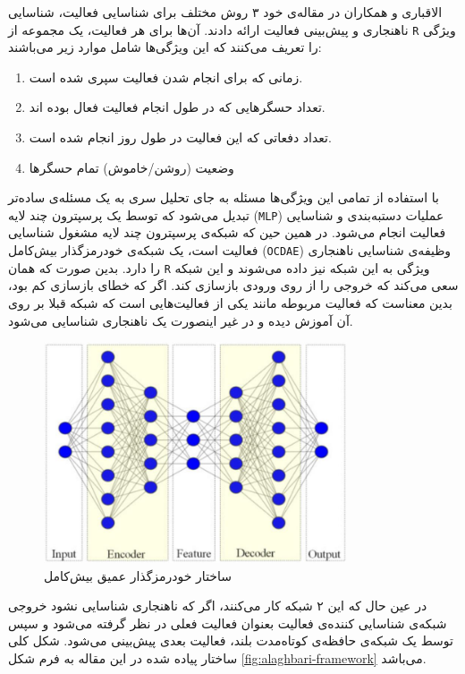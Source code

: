 الاقباری و همکاران\cite{alaghbari2022activities}
در مقاله‌ی خود ۳ روش مختلف برای شناسایی فعالیت، شناسایی ناهنجاری و پیش‌بینی فعالیت ارائه دادند. آن‌ها برای هر فعالیت، یک مجموعه از \verb|R| ویژگی را تعریف می‌کنند که این ویژگی‌ها شامل موارد زیر می‌باشند:
\begin{enumerate}
    \item زمانی که برای انجام شدن فعالیت سپری شده است.
    \item تعداد حسگرهایی که در طول انجام فعالیت فعال بوده اند.
    \item تعداد دفعاتی که این فعالیت در طول روز انجام شده است.
    \item وضعیت (روشن/خاموش) تمام حسگرها
\end{enumerate}

با استفاده از تمامی این ویژگی‌ها مسئله به جای تحلیل سری به یک مسئله‌ی ساده‌تر تبدیل می‌شود که توسط
یک پرسپترون چند لایه (\verb|MLP|)
عملیات دستبه‌بندی و شناسایی فعالیت انجام می‌شود. در همین حین که شبکه‌ی پرسپترون چند لایه مشغول شناسایی فعالیت است، یک
شبکه‌ی خودرمزگذار بیش‌کامل (\verb|OCDAE|)
وظیفه‌ی شناسایی ناهنجاری را دارد. بدین صورت که  همان \verb|R| ویژگی به این شبکه نیز داده می‌شوند و این شبکه سعی می‌کند که خروجی را از روی ورودی بازسازی کند. اگر که
خطای بازسازی
کم بود، بدین معناست که فعالیت مربوطه مانند یکی از فعالیت‌هایی است که شبکه قبلا بر روی آن آموزش دیده و در غیر اینصورت یک ناهنجاری شناسایی می‌شود.
\begin{figure}[htbp]
  \centering
  \includegraphics[width=0.8\textwidth]{Images/Chapter2/ocd-ae.png}
  \caption{ساختار خودرمزگذار عمیق بیش‌کامل}
  \label{fig:ocd-ae}
\end{figure}
در عین حال که این ۲ شبکه کار می‌کنند، اگر که ناهنجاری شناسایی نشود خروجی شبکه‌ی شناسایی کننده‌ی فعالیت بعنوان فعالیت فعلی در نظر گرفته می‌شود و سپس توسط یک شبکه‌ی حافظه‌ی کوتاه‌مدت بلند، فعالیت بعدی پیش‌بینی می‌شود. شکل کلی ساختار پیاده شده در این مقاله به فرم شکل \ref{fig:alaghbari-framework} می‌باشد.
